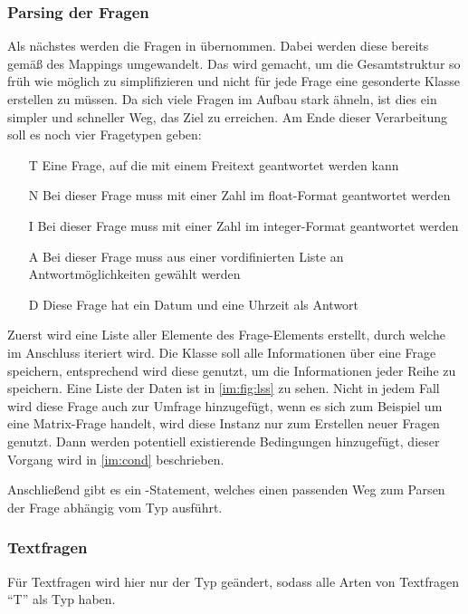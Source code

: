 \subsubsection{Parsing der Fragen}
\label{im:q}

Als nächstes werden die Fragen in  übernommen. Dabei werden diese bereits gemäß des Mappings umgewandelt.
Das wird gemacht, um die Gesamtstruktur so früh wie möglich zu simplifizieren und nicht für jede Frage eine gesonderte Klasse erstellen zu müssen.
Da sich viele Fragen im Aufbau stark ähneln, ist dies ein simpler und schneller Weg, das Ziel zu erreichen.
Am Ende dieser Verarbeitung soll es noch vier Fragetypen geben:

\begin{enumerate}[leftmargin=0.5cm]
\item[T] Eine Frage, auf die mit einem Freitext geantwortet werden kann
\item[N] Bei dieser Frage muss mit einer Zahl im float-Format geantwortet werden
\item[I] Bei dieser Frage muss mit einer Zahl im integer-Format geantwortet werden
\item[A] Bei dieser Frage muss aus einer vordifinierten Liste an Antwortmöglichkeiten gewählt werden
\item[D] Diese Frage hat ein Datum und eine Uhrzeit als Antwort
\end{enumerate}

Zuerst wird eine Liste aller  Elemente des Frage-Elements erstellt, durch welche im Anschluss iteriert wird.
Die Klasse  soll alle Informationen über eine Frage speichern, entsprechend wird diese genutzt, um die Informationen jeder Reihe zu speichern.
Eine Liste der Daten ist in \cref{im:fig:lss} zu sehen.
Nicht in jedem Fall wird diese Frage auch zur Umfrage hinzugefügt, wenn es sich zum Beispiel um eine Matrix-Frage handelt, wird diese Instanz nur zum Erstellen neuer Fragen genutzt.
Dann werden potentiell existierende Bedingungen hinzugefügt, dieser Vorgang wird in \cref{im:cond} beschrieben.

Anschließend gibt es ein -Statement, welches einen passenden Weg zum Parsen der Frage abhängig vom Typ ausführt.

\subsubsection{Textfragen}
Für Textfragen wird hier nur der Typ geändert, sodass alle Arten von Textfragen \enquote{T} als Typ haben.

